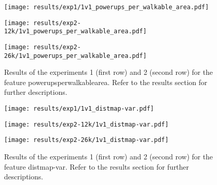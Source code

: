 \begin{figure}[h!]
	\centering
	\begin{minipage}{0.4\linewidth}
		\texttt{[image: results/exp1/1v1\_powerups\_per\_walkable\_area.pdf]}
	\end{minipage}
	
	\begin{minipage}{0.4\linewidth}
		\texttt{[image: results/exp2-12k/1v1\_powerups\_per\_walkable\_area.pdf]}
	\end{minipage}
	\begin{minipage}{0.4\linewidth}
		\texttt{[image: results/exp2-26k/1v1\_powerups\_per\_walkable\_area.pdf]}
	\end{minipage}
	
	\caption[ Results: Feature powerups\textunderscore per\textunderscore walkable\textunderscore area]{ Results of the experiments 1 (first row) and 2 (second row) for the feature powerups\textunderscore per\textunderscore walkable\textunderscore area. Refer to the results section for further descriptions. }
	\label{fig:appendix_powerups_per_walkable_area}
\end{figure}

\begin{figure}[h!]
	\centering
	\begin{minipage}{0.4\linewidth}
		\texttt{[image: results/exp1/1v1\_distmap-var.pdf]}
	\end{minipage}
	
	\begin{minipage}{0.4\linewidth}
		\texttt{[image: results/exp2-12k/1v1\_distmap-var.pdf]}
	\end{minipage}
	\begin{minipage}{0.4\linewidth}
		\texttt{[image: results/exp2-26k/1v1\_distmap-var.pdf]}
	\end{minipage}
	
	\caption[ Results: Feature distmap-var]{ Results of the experiments 1 (first row) and 2 (second row) for the feature distmap-var. Refer to the results section for further descriptions. }
	\label{fig:appendix_distmap-var}
\end{figure}
\newpage 


